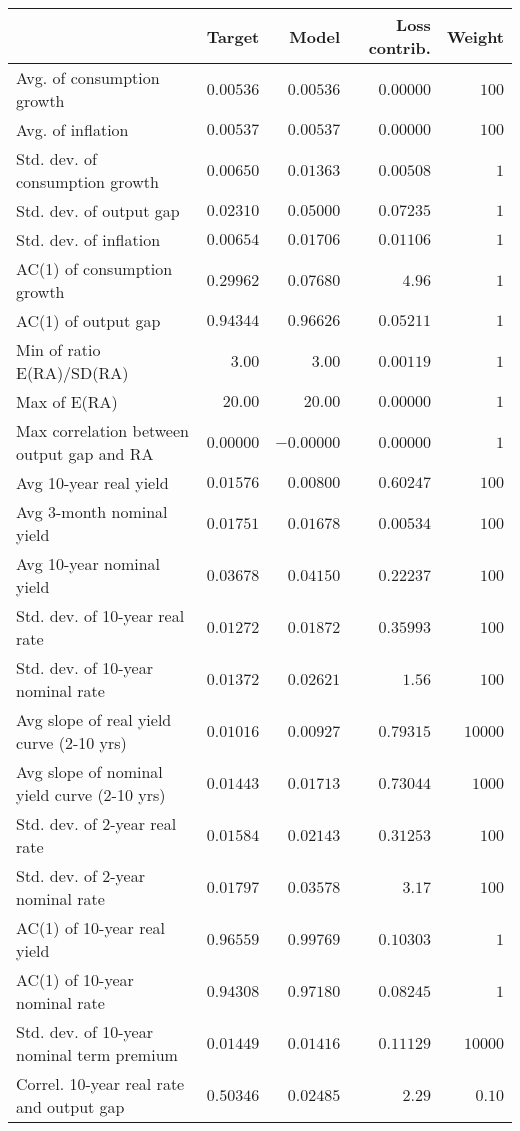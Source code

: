 \begin{tabular}{lrrrr} \hline  & Target & Model & Loss contrib. & Weight \\ \hline Avg. of consumption growth & $0.00536$ & $0.00536$ & $0.00000$ & $100$ \\ Avg. of inflation & $0.00537$ & $0.00537$ & $0.00000$ & $100$ \\ Std. dev. of consumption growth & $0.00650$ & $0.01363$ & $0.00508$ & $1$ \\ Std. dev. of output gap & $0.02310$ & $0.05000$ & $0.07235$ & $1$ \\ Std. dev. of inflation & $0.00654$ & $0.01706$ & $0.01106$ & $1$ \\ AC(1) of consumption growth & $0.29962$ & $0.07680$ & $4.96$ & $1$ \\ AC(1) of output gap & $0.94344$ & $0.96626$ & $0.05211$ & $1$ \\ Min of ratio E(RA)/SD(RA) & $3.00$ & $3.00$ & $0.00119$ & $1$ \\ Max of E(RA) & $20.00$ & $20.00$ & $0.00000$ & $1$ \\ Max correlation between output gap and RA & $0.00000$ & $-0.00000$ & $0.00000$ & $1$ \\ Avg 10-year real yield & $0.01576$ & $0.00800$ & $0.60247$ & $100$ \\ Avg 3-month nominal yield & $0.01751$ & $0.01678$ & $0.00534$ & $100$ \\ Avg 10-year nominal yield & $0.03678$ & $0.04150$ & $0.22237$ & $100$ \\ Std. dev. of 10-year real rate & $0.01272$ & $0.01872$ & $0.35993$ & $100$ \\ Std. dev. of 10-year nominal rate & $0.01372$ & $0.02621$ & $1.56$ & $100$ \\ Avg slope of real yield curve (2-10 yrs) & $0.01016$ & $0.00927$ & $0.79315$ & $10000$ \\ Avg slope of nominal yield curve (2-10 yrs) & $0.01443$ & $0.01713$ & $0.73044$ & $1000$ \\ Std. dev. of 2-year real rate & $0.01584$ & $0.02143$ & $0.31253$ & $100$ \\ Std. dev. of 2-year nominal rate & $0.01797$ & $0.03578$ & $3.17$ & $100$ \\ AC(1) of 10-year real yield & $0.96559$ & $0.99769$ & $0.10303$ & $1$ \\ AC(1) of 10-year nominal rate & $0.94308$ & $0.97180$ & $0.08245$ & $1$ \\ Std. dev. of 10-year nominal term premium & $0.01449$ & $0.01416$ & $0.11129$ & $10000$ \\ Correl. 10-year real rate and output gap & $0.50346$ & $0.02485$ & $2.29$ & $0.10$ \\ \hline \end{tabular}